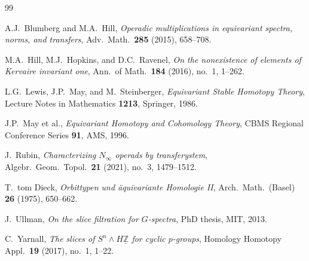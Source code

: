 \documentclass[12pt]{article}
\begin{document}
\begin{thebibliography}{99}

A.J.\ Blumberg and M.A.\ Hill,
\textit{Operadic multiplications in equivariant spectra, norms, and transfers},
Adv.\ Math.\ \textbf{285} (2015), 658--708.

M.A.\ Hill, M.J.\ Hopkins, and D.C.\ Ravenel,
\textit{On the nonexistence of elements of Kervaire invariant one},
Ann.\ of Math.\ \textbf{184} (2016), no.\ 1, 1--262.

L.G.\ Lewis, J.P.\ May, and M.\ Steinberger,
\textit{Equivariant Stable Homotopy Theory},
Lecture Notes in Mathematics \textbf{1213}, Springer, 1986.

J.P.\ May et al.,
\textit{Equivariant Homotopy and Cohomology Theory},
CBMS Regional Conference Series \textbf{91}, AMS, 1996.

J.\ Rubin,
\textit{Characterizing $N_\infty$ operads by transferystem},
Algebr.\ Geom.\ Topol.\ \textbf{21} (2021), no.\ 3, 1479--1512.

T.\ tom Dieck,
\textit{Orbittypen und \"{a}quivariante Homologie II},
Arch.\ Math.\ (Basel) \textbf{26} (1975), 650--662.

J.\ Ullman,
\textit{On the slice filtration for $G$-spectra},
PhD thesis, MIT, 2013.

C.\ Yarnall,
\textit{The slices of $S^n \wedge H\underline{\mathbb{Z}}$ for cyclic $p$-groups},
Homology Homotopy Appl.\ \textbf{19} (2017), no.\ 1, 1--22.

\end{thebibliography}
\end{document}
